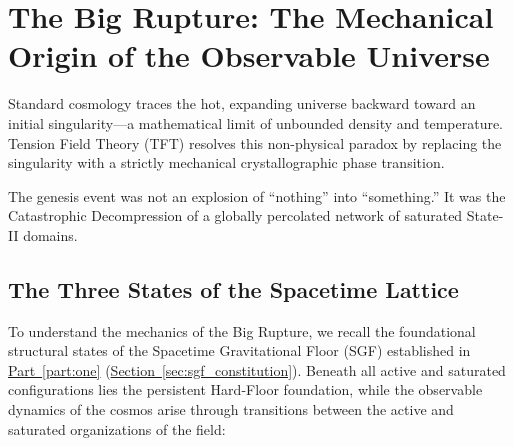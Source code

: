\chapter{The Big Rupture: The Mechanical Origin of the Observable Universe}
\label{chap:the_big_rupture}

Standard cosmology traces the hot, expanding universe backward toward an initial singularity---a mathematical limit of unbounded density and temperature. Tension Field Theory (TFT) resolves this non-physical paradox by replacing the singularity with a strictly mechanical crystallographic phase transition.

The genesis event was not an explosion of ``nothing'' into ``something.'' It was the Catastrophic Decompression of a globally percolated network of saturated State-II domains.

\section{The Three States of the Spacetime Lattice}

To understand the mechanics of the Big Rupture, we recall the foundational structural states of the Spacetime Gravitational Floor (SGF) established in \hyperref[part:one]{Part~\ref{part:one}} (\hyperref[sec:sgf_constitution]{Section~\ref*{sec:sgf_constitution}}). Beneath all active and saturated configurations lies the persistent Hard-Floor foundation, while the observable dynamics of the cosmos arise through transitions between the active and saturated organizations of the field:

